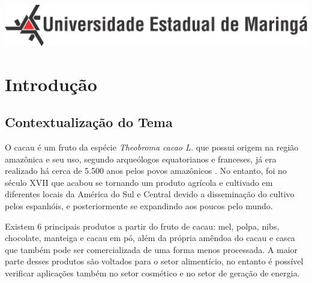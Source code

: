 \documentclass[
	12pt,				%
	openright,			%
	oneside,			%
	a4paper,			%
	english,			%
	french,				%
	spanish,			%
	brazil				%
	]{abntex2}
\begin{document}
\begin{minipage}[c][0cm][c]{0cm} %

\centering

\includegraphics[scale=0.45]{../../Pictures/uem-modelo-04.png}  
\end{minipage}


\frenchspacing 


\imprimircapa



 
 


\tableofcontents*
\cleardoublepage

\textual

\chapter{Introdução}

\section{Contextualização do Tema}

O cacau é um fruto da espécie \textit{Theobroma cacao L.} que possui origem na região amazônica e seu uso, segundo arqueólogos equatorianos e franceses, já era realizado há cerca de 5.500 anos pelos povos amazônicos \cite{2}. No entanto, foi no século XVII que acabou se tornando um produto agrícola e cultivado em diferentes locais da América do Sul e Central devido a disseminação do cultivo pelos espanhóis, e posteriormente se expandindo aos poucos pelo mundo. \cite{1} 

Existem 6 principais produtos a partir do fruto de cacau: mel, polpa, nibs, chocolate, manteiga e cacau em pó, além da própria amêndoa do cacau e casca que também pode ser comercializada de uma forma menos processada. A maior parte desses produtos são voltados para o setor alimentício, no entanto é possível verificar aplicações também no setor cosmético e no setor de geração de energia. \cite{5}
\end{document}
